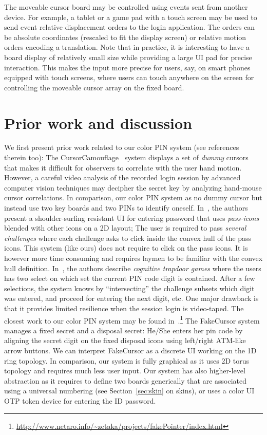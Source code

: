 \documentclass[12pt,onecolumn]{article}
\begin{document}
The moveable cursor board may be controlled using events sent from another device.
For example, a tablet or a game pad with a touch screen may be used to send event relative displacement orders to the login application.
The orders can be absolute coordinates (rescaled to fit the display screen) or relative motion orders encoding a translation.
Note that in practice, it is interesting to have a board display of relatively small size while providing a large UI pad for precise interaction.
This makes the input more precise for users, say, on  smart phones equipped with touch screens, where users can touch anywhere on the screen for controlling the moveable cursor array on the fixed board.


\section{Prior work and discussion\label{sec:concl}}
We first present prior work related to our color PIN system (see references therein too):
The CursorCamouflage~\cite{CursorCamouflage-2012} system   displays a set of {\em dummy} cursors that makes it difficult for observers to correlate with the user hand motion. However, a careful video analysis of the recorded login session by advanced computer vision techniques may decipher the secret key by analyzing hand-mouse cursor correlations. 
In comparison, our color PIN system as no dummy cursor but instead use two key boards and two PINs to identify oneself. In~\cite{UIConvexHullClick-2006}, the authors present a shoulder-surfing resistant UI for entering password that uses {\em pass-icons} blended with other icons on a 2D layout; The user is required to pass {\em several challenges} where each challenge asks to click inside the convex hull of the pass icons. This system (like ours) does not require to click on the pass icons. It is however more time consuming and requires laymen to be familiar with the convex hull definition.
In~\cite{PINEntry-2004}, the authors describe {\em cognitive trapdoor games }where the users has two select on which set the current PIN code digit is contained.
After a few selections, the system knows by ``intersecting'' the challenge subsets which digit was entered, and proceed for entering the next digit, etc. One major drawback is that it provides limited resilience when the session login is video-taped.
The closest work to our color PIN system may be found in~\cite{Fakecursor-2008}.\footnote{\url{http://www.netaro.info/~zetaka/projects/fakePointer/index.html}} 
The FakeCursor system manages a fixed secret and a disposal secret:
He/She enters her pin code by aligning the  secret digit on the fixed disposal icons using left/right ATM-like arrow buttons.  
We can interpret FakeCursor as a discrete UI working on the 1D ring topology.
In comparison, our system is fully graphical as it uses 2D torus topology and requires much less user input.  
Our system has also higher-level abstraction as it requires to define two boards generically that are associated using a universal numbering (see Section~\ref{sec:skin} on skins), or uses a color UI OTP token device for entering the ID password.
\end{document}
